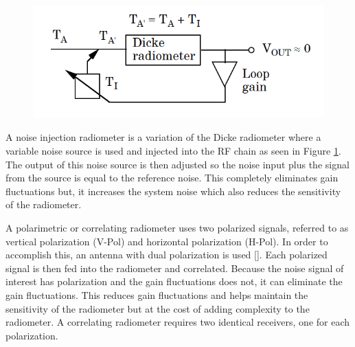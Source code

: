 {\begin{figure}[h!tb] 
\centering
\includegraphics[width=\textwidth]{Images/NoiseInj_block.png}
\label{NoiseInj_radiometer}
\end{figure}
}

A noise injection radiometer is a variation of the Dicke radiometer where a variable noise source is used and injected into the RF chain as seen in Figure \ref{NoiseInj_radiometer}.  The output of this noise source is then adjusted so the noise input plus the signal from the source is equal to the reference noise.  This completely eliminates gain fluctuations but, it increases the system noise which also reduces the sensitivity of the radiometer.

A polarimetric or correlating radiometer uses two polarized signals, referred to as vertical polarization (V-Pol) and horizontal polarization (H-Pol).  In order to accomplish this, an antenna with dual polarization is used [\cite{Fujimoto}].  Each polarized signal is then fed into the radiometer and correlated.  Because the noise signal of interest has polarization and the gain fluctuations does not, it can eliminate the gain fluctuations.  This reduces gain fluctuations and helps maintain the sensitivity of the radiometer but at the cost of adding complexity to the radiometer. A correlating radiometer requires two identical receivers, one for each polarization. 




